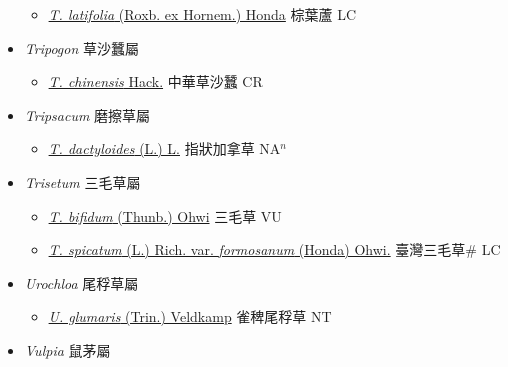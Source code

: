 \begin{itemize}
  \begin{itemize}
        \item[] \href{http://www.theplantlist.org/tpl1.1/search?q=Thysanolaena+latifolia}{\textit{T. latifolia} (Roxb. ex Hornem.) Honda}   棕葉蘆 LC
  \end{itemize}
 \item[] \textit{Tripogon} 草沙蠶屬
                    
  \begin{itemize}
        \item[] \href{http://www.theplantlist.org/tpl1.1/search?q=Tripogon+chinensis}{\textit{T. chinensis} Hack.}   中華草沙蠶 CR
  \end{itemize}
 \item[] \textit{Tripsacum} 磨擦草屬
                    
  \begin{itemize}
        \item[] \href{http://www.theplantlist.org/tpl1.1/search?q=Tripsacum+dactyloides}{\textit{T. dactyloides} (L.) L.}   指狀加拿草 NA$^n$
  \end{itemize}
 \item[] \textit{Trisetum} 三毛草屬
                    
  \begin{itemize}
        \item[] \href{http://www.theplantlist.org/tpl1.1/search?q=Trisetum+bifidum}{\textit{T. bifidum} (Thunb.) Ohwi}   三毛草 VU
        \item[] \href{http://www.theplantlist.org/tpl1.1/search?q=Trisetum+spicatum+var.+formosanum}{\textit{T. spicatum} (L.) Rich. var. \textit{formosanum} (Honda) Ohwi.}   臺灣三毛草\# LC
  \end{itemize}
 \item[] \textit{Urochloa} 尾稃草屬
                    
  \begin{itemize}
        \item[] \href{http://www.theplantlist.org/tpl1.1/search?q=Urochloa+glumaris}{\textit{U. glumaris} (Trin.) Veldkamp}   雀稗尾稃草 NT
  \end{itemize}
 \item[] \textit{Vulpia} 鼠茅屬
                    

\end{itemize}
